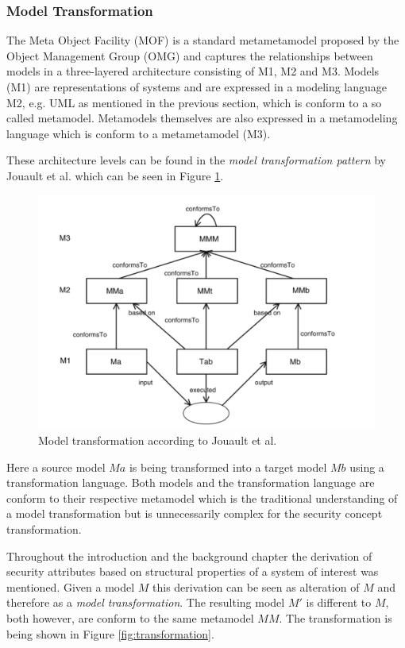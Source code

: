\subsubsection{Model Transformation}
\label{subsubsec:modeltrans}
The Meta Object Facility (MOF) \cite{omg2013mof} is a standard metametamodel proposed by the Object Management Group (OMG) and captures the relationships between models in a three-layered architecture consisting of M1, M2 and M3. Models (M1) are representations of systems and are expressed in a modeling language M2, e.g. UML as mentioned in the previous section, which is conform to a so called metamodel. Metamodels themselves are also expressed in a metamodeling language which is conform to a metametamodel (M3). 

These architecture levels can be found in the \textit{model transformation pattern} by Jouault et al. \cite{modeltrans} which can be seen in Figure \ref{fig:metametamodel}. 

\begin{figure}[H]
\centering
\includegraphics[width=\textwidth]{pictures/metametamodel.png}
\caption{Model transformation according to Jouault et al.}
\label{fig:metametamodel}
\end{figure}

Here a source model $Ma$ is being transformed into a target model $Mb$ using a transformation language. Both models and the transformation language are conform to their respective metamodel which is the traditional understanding of a model transformation but is unnecessarily complex for the security concept transformation.

Throughout the introduction and the background chapter the derivation of security attributes based on structural properties of a system of interest was mentioned. Given a model $M$ this derivation can be seen as alteration of $M$ and therefore as a \textit{model transformation}. The resulting model $M'$ is different to $M$, both however, are conform to the same metamodel $MM$. The transformation is being shown in Figure \ref{fig:transformation}.


